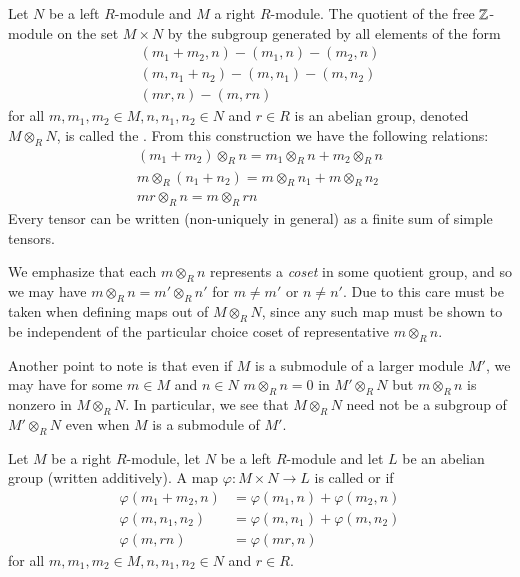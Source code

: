 \documentclass[12pt, a4paper, oneside, openright, titlepage]{book}
\begin{document}
\begin{cons}
    Let $N$ be a left $R$-module and $M$ a right $R$-module. The quotient of the free $\mathbb Z$-module on the set $M\times N$ by the subgroup generated by all elements of the form \begin{equation*}
        \begin{array}{c}
            (m_1+m_2,n) - (m_1,n) - (m_2,n) \\
            (m,n_1+n_2) - (m,n_1) - (m,n_2) \\
            (mr,n) - (m,rn)
        \end{array}
    \end{equation*}
    for all $m,m_1,m_2\in M,n,n_1,n_2 \in N$ and $r \in R$ is an abelian group, denoted $M\otimes_RN$, is called the . From this construction we have the following relations: \begin{equation*}
        \begin{array}{c}
            (m_1+m_2)\otimes_Rn = m_1\otimes_Rn + m_2\otimes_Rn \\
            m\otimes_R(n_1+n_2) = m\otimes_Rn_1+m\otimes_Rn_2 \\
            mr\otimes_Rn = m\otimes_Rrn
        \end{array}
    \end{equation*}
    Every tensor can be written (non-uniquely in general) as a finite sum of simple tensors.
\end{cons}

\begin{rmk}
    We emphasize that each $m\otimes_Rn$ represents a \emph{coset} in some quotient group, and so we may have $m\otimes_Rn = m'\otimes_Rn'$ for $m\neq m'$ or $n \neq n'$. Due to this care must be taken when defining maps out of $M\otimes_RN$, since any such map must be shown to be independent of the particular choice coset of representative $m\otimes_Rn$.

    Another point to note is that even if $M$ is a submodule of a larger module $M'$, we may have for some $m \in M$ and $n \in N$ $m \otimes_Rn = 0$ in $M'\otimes_RN$ but $m\otimes_Rn$ is nonzero in $M\otimes_RN$. In particular, we see that $M\otimes_RN$ need not be a subgroup of $M'\otimes_RN$ even when $M$ is a submodule of $M'$.
\end{rmk}

\begin{defn}
    Let $M$ be a right $R$-module, let $N$ be a left $R$-module and let $L$ be an abelian group (written additively). A map $\varphi:M\times N\rightarrow L$ is called  or  if \begin{align*}
        \varphi(m_1+m_2,n) &= \varphi(m_1,n) + \varphi(m_2,n) \\
        \varphi(m,n_1,n_2) &= \varphi(m,n_1)+\varphi(m,n_2) \\
        \varphi(m,rn) &= \varphi(mr,n)
    \end{align*}
    for all $m,m_1,m_2 \in M, n,n_1,n_2 \in N$ and $r \in R$.
\end{defn}
\end{document}
